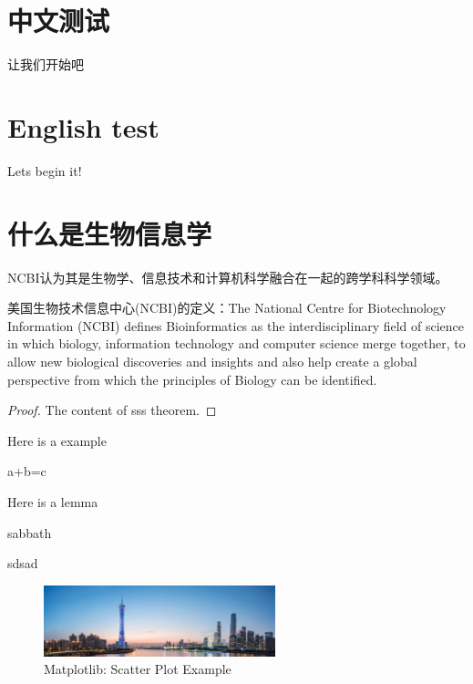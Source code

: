 \documentclass[]{subook}
\begin{document}
\section{中文测试}
让我们开始吧~ 
\zhlipsum[1-3]

\section{English test}

Lets begin it!
\lipsum[1-2]


\section{什么是生物信息学
}

NCBI认为其是生物学、信息技术和计算机科学融合在一起的跨学科科学领域。

美国生物技术信息中心(NCBI)的定义：The National Centre for Biotechnology Information (NCBI) defines Bioinformatics as the interdisciplinary field of science in which biology, information technology and computer science merge together, to allow new biological discoveries and insights and also help create a global perspective from which the principles of Biology can be identified. 
\begin{proof}
    The content of sss theorem.
\end{proof}



Here is a example
\begin{example}
    a+b=c
\end{example}



Here is a lemma
\begin{lemma}
    sabbath
\end{lemma}


\begin{definition}
    sdsad
\end{definition}

\begin{fullpage}
\zhlipsum[2-4]

\begin{figure}
    \centering
    \includegraphics[width=0.6\textwidth]{img/cantontower.jpeg}
    \caption{Matplotlib: Scatter Plot Example\label{fig:scatter}}
\end{figure}

\end{fullpage}
\end{document}
